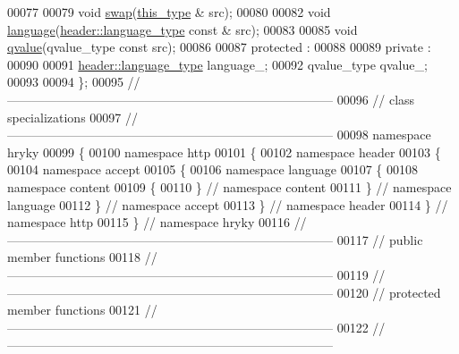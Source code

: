 \begin{DoxyCode}
00077 
00079     \textcolor{keywordtype}{void} \hyperlink{classhryky_1_1http_1_1header_1_1accept_1_1language_1_1content_1_1_entity_a5401f74c11f0fc6927c3ca5142fc2315}{swap}(\hyperlink{classhryky_1_1http_1_1header_1_1accept_1_1language_1_1content_1_1_entity}{this_type} & src);
00080 
00082     \textcolor{keywordtype}{void} \hyperlink{classhryky_1_1http_1_1header_1_1accept_1_1language_1_1content_1_1_entity_a11258461daa9e9b7b5bfb98963f22792}{language}(\hyperlink{classhryky_1_1http_1_1header_1_1language_1_1_entity}{header::language_type} \textcolor{keyword}{const} & src);
00083 
00085     \textcolor{keywordtype}{void} \hyperlink{classhryky_1_1http_1_1header_1_1accept_1_1language_1_1content_1_1_entity_a3fce61cc8b0a590cd39974530aa3ded1}{qvalue}(qvalue\_type \textcolor{keyword}{const} src);
00086 
00087 \textcolor{keyword}{protected} :
00088 
00089 \textcolor{keyword}{private} :
00090 
00091     \hyperlink{classhryky_1_1http_1_1header_1_1language_1_1_entity}{header::language_type} language\_;
00092     qvalue\_type qvalue\_;
00093 
00094 \};
00095 \textcolor{comment}{//
      ------------------------------------------------------------------------------}
00096 \textcolor{comment}{// class specializations}
00097 \textcolor{comment}{//
      ------------------------------------------------------------------------------}
00098 \textcolor{keyword}{namespace }hryky
00099 \{
00100 \textcolor{keyword}{namespace }http
00101 \{
00102 \textcolor{keyword}{namespace }header
00103 \{
00104 \textcolor{keyword}{namespace }accept
00105 \{
00106 \textcolor{keyword}{namespace }language
00107 \{
00108 \textcolor{keyword}{namespace }content
00109 \{
00110 \} \textcolor{comment}{// namespace content}
00111 \} \textcolor{comment}{// namespace language}
00112 \} \textcolor{comment}{// namespace accept}
00113 \} \textcolor{comment}{// namespace header}
00114 \} \textcolor{comment}{// namespace http}
00115 \} \textcolor{comment}{// namespace hryky}
00116 \textcolor{comment}{//
      ------------------------------------------------------------------------------}
00117 \textcolor{comment}{// public member functions}
00118 \textcolor{comment}{//
      ------------------------------------------------------------------------------}
00119 \textcolor{comment}{//
      ------------------------------------------------------------------------------}
00120 \textcolor{comment}{// protected member functions}
00121 \textcolor{comment}{//
      ------------------------------------------------------------------------------}
00122 \textcolor{comment}{//
      ------------------------------------------------------------------------------}

\end{DoxyCode}
